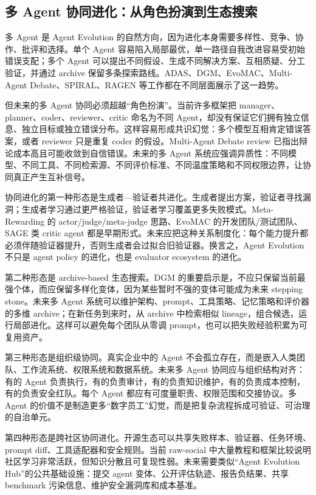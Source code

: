 \subsection{多 Agent 协同进化：从角色扮演到生态搜索}\label{sec:ch8-multiagent}

多 Agent 是 Agent Evolution 的自然方向，因为进化本身需要多样性、竞争、协作、批评和选择。单个 Agent 容易陷入局部最优，单一路径自我改进容易受初始错误支配；多个 Agent 可以提出不同假设、生成不同解决方案、互相质疑、分工验证，并通过 archive 保留多条探索路线。ADAS、DGM、EvoMAC、Multi-Agent Debate、SPIRAL、RAGEN 等工作都在不同层面展示了这一趋势。

但未来的多 Agent 协同必须超越``角色扮演''。当前许多框架把 manager、planner、coder、reviewer、critic 命名为不同 Agent，却没有保证它们拥有独立信息、独立目标或独立错误分布。这样容易形成共识幻觉：多个模型互相肯定错误答案，或者 reviewer 只是重复 coder 的假设。Multi-Agent Debate review 已指出辩论成本高且可能收敛到自信错误。未来的多 Agent 系统应强调异质性：不同模型、不同工具、不同检索源、不同评价标准、不同温度策略和不同权限边界，让协同真正产生互补信号。

协同进化的第一种形态是生成者---验证者共进化。生成者提出方案，验证者寻找漏洞；生成者学习通过更严格验证，验证者学习覆盖更多失败模式。Meta-Rewarding 的 actor/judge/meta-judge 思路、EvoMAC 的开发团队/测试团队、SAGE 类 critic agent 都是早期形式。未来应把这种关系制度化：每个能力提升都必须伴随验证器提升，否则生成者会过拟合旧验证器。换言之，Agent Evolution 不只是 agent policy 的进化，也是 evaluator ecosystem 的进化。

第二种形态是 archive-based 生态搜索。DGM 的重要启示是，不应只保留当前最强个体，而应保留多样化变体，因为某些暂时不强的变体可能成为未来 stepping stone。未来多 Agent 系统可以维护架构、prompt、工具策略、记忆策略和评价器的多维 archive；在新任务到来时，从 archive 中检索相似 lineage，组合候选，运行局部进化。这样可以避免每个团队从零调 prompt，也可以把失败经验积累为可复用资产。

第三种形态是组织级协同。真实企业中的 Agent 不会孤立存在，而是嵌入人类团队、工作流系统、权限系统和数据系统。未来多 Agent 协同应与组织结构对齐：有的 Agent 负责执行，有的负责审计，有的负责知识维护，有的负责成本控制，有的负责安全红队。每个 Agent 都应有可度量职责、权限范围和交接协议。多 Agent 的价值不是制造更多``数字员工''幻觉，而是把复杂流程拆成可验证、可治理的自治单元。

第四种形态是跨社区协同进化。开源生态可以共享失败样本、验证器、任务环境、prompt diff、工具适配器和安全规则。当前 raw-social 中大量教程和框架比较说明社区学习非常活跃，但知识分散且可复现性弱。未来需要类似``Agent Evolution Hub''的公共基础设施：提交 agent 变体、公开评估轨迹、报告负结果、共享 benchmark 污染信息、维护安全漏洞库和成本基准。

